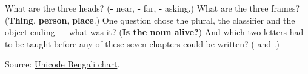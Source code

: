\begin{tcolorbox}[breakable,colback=teal!4,colframe=teal!35!black,title={Before you move on}]
What are the three heads? (\textbf{-} near, \textbf{-} far, \textbf{-} asking.) What are the three frames? (\textbf{Thing}, \textbf{person}, \textbf{place}.) One question chose the plural, the classifier and the object ending — what was it? (\textbf{Is the noun alive?}) And which two letters had to be taught before any of these seven chapters could be written? (\textbf{} and \textbf{}.)

Source: \href{https://www.unicode.org/charts/PDF/U0980.pdf}{Unicode Bengali chart}.
\end{tcolorbox}
